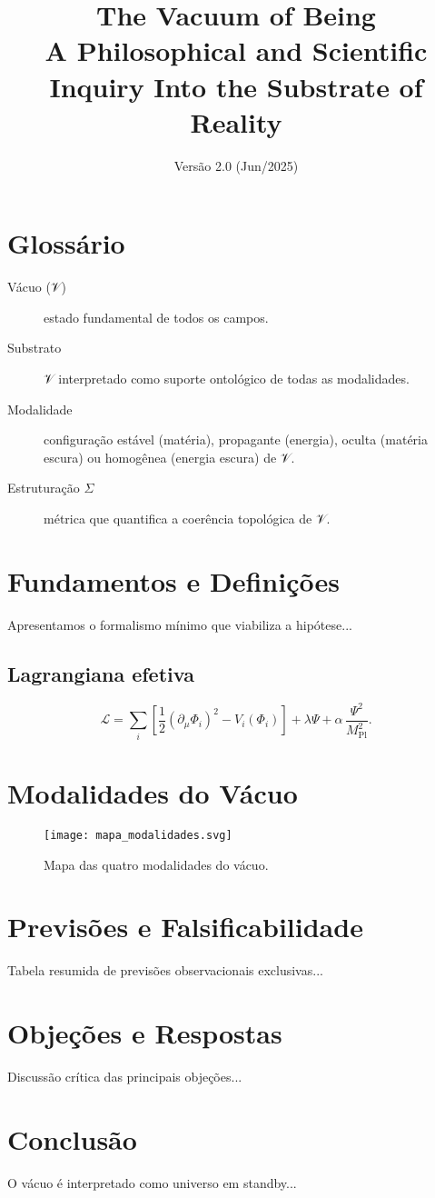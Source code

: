 \documentclass[11pt,a4paper]{article}
\title{The Vacuum of Being\\\large A Philosophical and Scientific Inquiry Into the Substrate of Reality}
\author{Versão 2.0 (Jun/2025)}
\date{}
\begin{document}
\maketitle
\tableofcontents

\section*{Glossário}
\begin{description}
\item[Vácuo (𝒱)] estado fundamental de todos os campos.
\item[Substrato] 𝒱 interpretado como suporte ontológico de todas as modalidades.
\item[Modalidade] configuração estável (matéria), propagante (energia), oculta (matéria escura) ou homogênea (energia escura) de 𝒱.
\item[Estruturação $\Sigma$] métrica que quantifica a coerência topológica de 𝒱.
\end{description}

\section{Fundamentos e Definições}
Apresentamos o formalismo mínimo que viabiliza a hipótese...

\subsection{Lagrangiana efetiva}
\begin{equation}
\mathcal{L} = \sum_i \left[\frac12(\partial_\mu\Phi_i)^2 - V_i(\Phi_i)\right] + \lambda \Psi + \alpha\,\frac{\Psi^{2}}{M_\text{Pl}^{2}}.
\end{equation}

\section{Modalidades do Vácuo}
\begin{figure}[h]
\centering
\texttt{[image: mapa\_modalidades.svg]}
\caption{Mapa das quatro modalidades do vácuo.}
\end{figure}

\section{Previsões e Falsificabilidade}
Tabela resumida de previsões observacionais exclusivas...

\section{Objeções e Respostas}
Discussão crítica das principais objeções...

\section{Conclusão}
O vácuo é interpretado como universo em standby...
\end{document}
